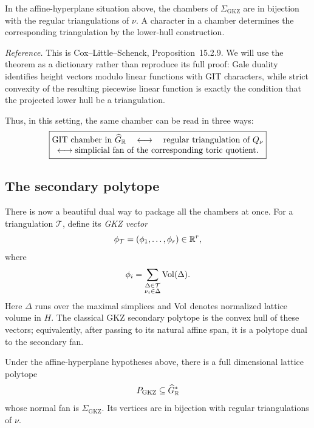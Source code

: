 \begin{theorem}
\label{thm:gkz-chambers-triangulations}
In the affine-hyperplane situation above, the chambers of
\(\Sigma_{\mathrm{GKZ}}\) are in bijection with the regular
triangulations of \(\nu\).  A character in a chamber determines the
corresponding triangulation by the lower-hull construction.
\end{theorem}

\noindent
\textit{Reference.}
This is Cox--Little--Schenck, Proposition~15.2.9.  We will use the
theorem as a dictionary rather than reproduce its full proof: Gale
duality identifies height vectors modulo linear functions with GIT
characters, while strict convexity of the resulting piecewise linear
function is exactly the condition that the projected lower hull be a
triangulation.

Thus, in this setting, the same chamber can be read in three ways:
\[
\boxed{
\begin{gathered}
\text{GIT chamber in }\widehat G_{\mathbb{R}}
\quad\longleftrightarrow\quad
\text{regular triangulation of }Q_\nu
\\[-1mm]
\longleftrightarrow
\text{simplicial fan of the corresponding toric quotient}.
\end{gathered}}
\]

\subsection{The secondary polytope}

There is now a beautiful dual way to package all the chambers at once.
For a triangulation \(\mathcal T\), define its \emph{GKZ vector}
\[
\phi_{\mathcal T}
=
(\phi_1,\dots,\phi_r)\in\mathbb{R}^r,
\]
where
\[
\phi_i
=
\sum_{\substack{\Delta\in\mathcal T\\ \nu_i\in\Delta}}
\operatorname{Vol}(\Delta).
\]
Here \(\Delta\) runs over the maximal simplices and
\(\operatorname{Vol}\) denotes
normalized lattice volume in \(H\).  The classical GKZ secondary
polytope is the convex hull of these vectors; equivalently, after
passing to its natural affine span, it is a polytope dual to the
secondary fan.

\begin{theorem}
\label{thm:secondary-polytope}
Under the affine-hyperplane hypotheses above, there is a full
dimensional lattice polytope
\[
P_{\mathrm{GKZ}}\subseteq\widehat G_{\mathbb{R}}^*
\]
whose normal fan is \(\Sigma_{\mathrm{GKZ}}\).  Its vertices are in
bijection with regular triangulations of \(\nu\).
\end{theorem}

